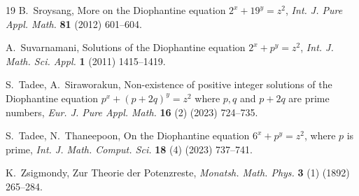 \documentclass[preprint,12pt]{elsarticle}
\theoremstyle{definition}
\begin{document}
\begin{thebibliography}{19}
B.~Sroysang,
More on the Diophantine equation $2^{x}+19^{y}=z^{2}$,
\emph{Int. J. Pure Appl. Math.} \textbf{81} (2012) 601--604.

A.~Suvarnamani,
Solutions of the Diophantine equation $2^{x}+p^{y}=z^{2}$,
\emph{Int. J. Math. Sci. Appl.} \textbf{1} (2011) 1415--1419.

S.~Tadee, A.~Siraworakun,
Non-existence of positive integer solutions of the Diophantine equation
$p^{x}+(p+2q)^{y}=z^{2}$ where $p,q$ and $p+2q$ are prime numbers,
\emph{Eur. J. Pure Appl. Math.} \textbf{16} (2) (2023) 724--735.

S.~Tadee, N.~Thaneepoon,
On the Diophantine equation $6^{x}+p^{y}=z^{2}$, where $p$ is prime,
\emph{Int. J. Math. Comput. Sci.} \textbf{18} (4) (2023) 737--741.

K.~Zsigmondy,
Zur Theorie der Potenzreste,
\emph{Monatsh. Math. Phys.} \textbf{3} (1) (1892) 265--284.

\end{thebibliography}
\end{document}
